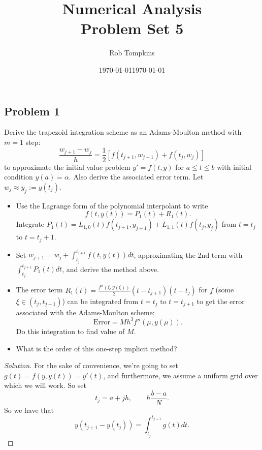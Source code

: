\documentclass[12pt]{amsart}
\title{Numerical Analysis\\Problem Set 5}
\author{Rob Tompkins}
\date{\today}
\newenvironment{solution}
{\begin{proof}[Solution]}
{\end{proof}}
\begin{document}
    \maketitle
    \date{\today}
    \begin{onehalfspace}

        \section{Problem 1}
        Derive the trapezoid integration scheme as an Adams-Moulton method with $m = 1$ step:
        \[
            \frac{w_{j+1}-w_j}{h} = \frac{1}{2}[f(t_{j+1},w_{j+1}) + f(t_j, w_j)]
        \]
        to approximate the initial value problem $y'=f(t,y)$ for $a\le t \le b$ with initial condition
        $y(a)=\alpha$.
        Also derive the associated error term.
        Let $w_j \approx y_j := y(t_j)$.
        \begin{itemize}
            \item[(a)] Use the Lagrange form of the polynomial interpolant to write
            \[
                f(t, y(t)) = P_1(t) + R_1(t).
            \]
            Integrate $P_1(t) = L_{1,0}(t)f(t_{j+1}, y_{j+1}) + L_{1,1}(t)f(t_j,y_j)$ from $t = t_j$ to $t=t_j+1$.
            \item[(b)] Set $w_{j+1} = w_j + \int_{t_j}^{t_{j+1}} f(t,y(t))dt$, approximating the 2nd term with
            $\int_{t_j}^{t_{j+1}} P_1(t)dt$, and derive the method above.
            \item[(c)] The error term $R_1(t) = \frac{f''(\xi,y(\xi))}{2}(t-t_{j+1})(t-t_j)$ for $f$ (some
            $\xi\in(t_j,t_{j+1})$) can be integrated from $t=t_j$ to $t=t_{j+1}$ to get the error associated
            with the Adams-Moulton scheme:
            \[
                \text{Error} = Mh^3 f''(\mu, y(\mu)).
            \]
            Do this integration to find value of $M$.
            \item[(d)] What is the order of this one-step implicit method?
        \end{itemize}

        \begin{solution}
            For the sake of convenience, we're going to set $g(t) = f(y,y(t)) = y'(t)$, and furthermore, we
            assume a uniform grid over which we will work.
            So set
            \[
                t_j = a + jh,\qquad h\frac{b-a}{N}.
            \]
            So we have that
            \[
                y(t_{j+1} - y(t_j)) = \int_{t_j}^{t_{j+1}} g(t) dt.
            \]


\end{solution}
\end{onehalfspace}
\end{document}
